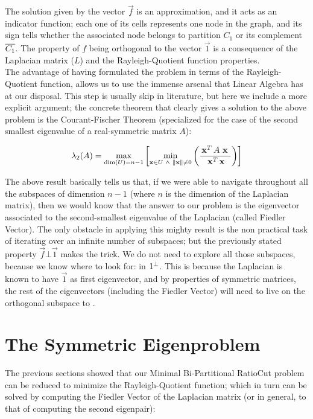 The solution given by the vector $\vec{f}$ is an approximation, and it acts
as an indicator function; each one of its cells represents one node in
the graph, and its sign tells whether the associated node belongs to
partition $C_1$ or its complement $\overline{C_1}$. The property of $f$
being orthogonal to the vector $\vec{1}$ is a consequence of the
Laplacian matrix ($L$) and the Rayleigh-Quotient function
properties. \\

The advantage of having formulated the problem in terms of the
Rayleigh-Quotient function, allows us to use the immense arsenal that
Linear Algebra has at our disposal. This step is usually skip in
literature, but here we include a more explicit argument; the concrete
theorem that clearly gives a solution to the above problem is the
Courant-Fischer Theorem (specialized for the case of the second
smallest eigenvalue of a real-symmetric matrix $A$):

\begin{equation*}
\lambda_2(A) =
\max\limits_{\operatorname{dim}(U) = n-1}
\left[
\min\limits_{\mathbf{x} \in U \,\,\land\,\, \left\lVert \mathbf{x} \right\rVert \ne 0}
\left(  
\dfrac{\,{\mathbf{x}}^{T}\, A \,\,\mathbf{x}\,\,}{\,{\mathbf{x}}^{T}\, \mathbf{x}}
\right)
\right]
\end{equation*}
\joinbelow{1cm}

The above result basically tells us that, if we were able to navigate
throughout all the subspaces of dimension $n-1$ (where $n$ is the
dimension of the Laplacian matrix), then we would know that the answer
to our problem is the eigenvector associated to the second-smallest
eigenvalue of the Laplacian (called Fiedler Vector). The only obstacle
in applying this mighty result is the non practical task of iterating
over an infinite number of subspaces; but the previously stated
property $\vec{f} \bot \vec{1}$ makes the trick. We do not need to
explore all those subspaces, because we know where to look for: in
${1}^{\bot}$. This is because the Laplacian is known to have $\vec{1}$ as first
eigenvector, and by properties of symmetric matrices, the rest of the
eigenvectors (including the Fiedler Vector) will need to live on the
orthogonal subspace to . 

\section{The Symmetric Eigenproblem}

The previous sections showed that our Minimal Bi-Partitional RatioCut
problem can be reduced to minimize the Rayleigh-Quotient function;
which in turn can be solved by computing the Fiedler Vector of the
Laplacian matrix (or in general, to that of computing the second
eigenpair): 


